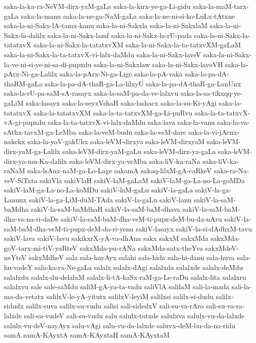 {saka-la-ka-ra-NeVM-dirx-yaM-gaLa
saka-la-kirx-ye-ga-Li-gidu
saka-la-maM-tarx-gaLa
saka-la-manu
saka-la-ne-ga-NaM-gaLa
saka-la-ne-ni-si-ko-LuLx-tAtxne
saka-la-ni-Sakx-lA-tamx-kanu
saka-la-ni-Sakxla
saka-la-ni-SakxlaM
saka-la-ni-Sakx-la-dalilx
saka-la-ni-Sakx-lamf
saka-la-ni-Sakx-la-rU-pada
saka-la-ni-Sakx-la-tatatxvX
saka-la-ni-Sakx-la-tatatxvXM
saka-la-ni-Sakx-la-ta-tatxvXM-gaLaM
saka-la-ni-Sakx-la-ta-tatxvX-vi-lalx-daMdu
saka-la-ni-Sakx-laveV
saka-la-ni-Sakx-la-ve-ni-si-ye-ni-sa-di-pupxdu
saka-la-ni-Sakxlaw
saka-la-ni-Sakx-layoVH
saka-la-pArx-Ni-ga-Lalilx
saka-la-pArx-Ni-ga-Lige
saka-la-pA-vaka
saka-la-pa-dA-thaRM-gaLa
saka-la-pa-dA-thaR-ga-La-lilxyU
saka-la-pa-dA-thaR-ga-LanUnx
saka-la-rU-pa-saM-sA-rasayx
saka-la-saM-pa-da-ve-lalxvu
saka-la-sa-tikxqq-ye-gaLiM
saka-lasayx
saka-la-seyxVshaH
saka-lashacx
saka-la-su-Ki-yAgi
saka-la-tatatxvX
saka-la-tatatxvXM
saka-la-ta-tatxvXM-ga-Li-puRvu
saka-la-ta-tatxvX-vA-gi-pupxdu
saka-la-ta-tatxvX-vi-lalx-daMdu
saka-lava
saka-la-vanu
saka-la-va-sAthx-tavxM-ga-LeMba
saka-la-veM-budu
saka-la-veM-dare
saka-la-vi-jAcnx-nakekx
saka-la-yoV-gakUkx
saka-leVM-dirxya
saka-leVM-dirxyaM
saka-leVM-dirx-yaM-ga-Lalilx
saka-leVM-dirx-yaM-gaLu
saka-leVM-dirx-ya-gaLa
saka-leVM-dirx-ya-mu-Ka-dalilx
saka-leVM-dirx-ya-veMba
saka-liV-ka-raNa
saka-liV-ka-raNaM
saka-lsAnx-naM-ga-Lo-Lage
sakamA
sakaq-lilxM-gA-caRkeV
saka-ra-Na-veV-SiTxta
sakiVla
sakiVlaH
sakiV-laM-gaLaM
sakiV-laM-ga-La-no-La-goMDa
sakiV-laM-ga-La-no-La-koMDu
sakiV-laM-gaLu
sakiV-la-gaLa
sakiV-la-ga-Lanunx
sakiV-la-ga-LiM-duM-TAda
sakiV-la-gaLu
sakiV-lanu
sakiV-la-saM-baMdha
sakiV-la-saM-baMdhaH
sakiV-la-saM-baM-dhava
sakiV-la-saM-baM-dha-va-na-ri-daDe
sakiV-la-saM-baM-dha-veM-ti-pupx-deM-bu-da-nAru
sakiV-la-saM-baM-dha-veM-ti-pupx-deM-da-ri-yenu
sakiV-lasayx
sakiV-la-si-dAdhxM-tavu
sakiV-lava
sakiV-lavu
sakikxrX-yA-va-dhAna
sakx
sakxM
sakxMda
sakxMda-goV-tarx-mi-tiV-yaRteV
sakxMda-pu-rANa
sakxMda-satx-theYva
sakxMdeV-neYteV
sakxMdheV
sala
sala-hayAyx
salahi
sala-hida
sala-hi-danu
sala-huva
sala-hu-vadeY
sala-ka-ra-Ne-gaLa
salalx
salalx-dAgi
salalxda
salalxde
salalx-deMdu
salalxdu
salalx-du-delalxM
salalx-li-tA-kaSx-raM-ga-Le-raDu
salalx-lita
salalxru
salalxvu
sale
sale-saMdu
saliM-gA-ya-ta-vadu
saliVlA
salilaM
sali-la-mada
sali-la-ma-da-vetatx
salilxV-le-yA-yitutx
salilxV-leyiM
salilxsi
salilx-si-dudu
salilx-sidudx
salilx-suva
salilx-su-vudu
salisi
sali-sidedxV
sali-su-va-rAro
sali-su-va-ra-lalxde
sali-su-vudeV
sali-su-vudu
salu
salulx-tatxde
salulxva
salulx-vu-da-lalxde
salulx-vu-deV-nayAyx
salu-vAgi
salu-vu-da-lalxde
saluvx-deM-bu-da-na-ridu
samA
samA-KAyxtA
samA-KAyxtaH
samA-KAyxtaM
}
